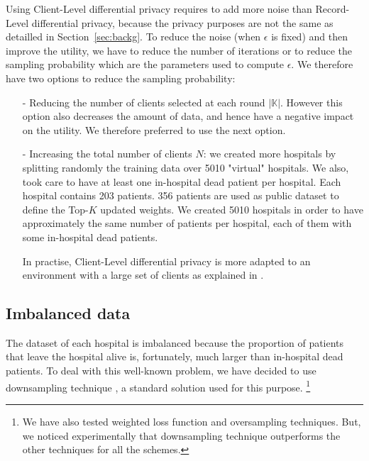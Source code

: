 \documentclass[accepted]{uai2021} %
\newcommand{\TOPK}{Top-$K$\xspace}
\begin{document}
\begin{enumerate}
    Using Client-Level differential privacy requires to add more noise than Record-Level differential privacy, because the privacy purposes are not the same as detailled in Section~\ref{sec:backg}. To reduce the noise (when $\epsilon$ is fixed) and then improve the utility, we have to reduce the number of iterations or to reduce the sampling probability which are the parameters used to compute $\epsilon$. We therefore have two options to reduce the sampling probability:
    \begin{itemize}
        \item[-] Reducing the number of clients selected at each round $|\mathbb{K}|$. However this option also decreases the amount of data, and hence have a negative impact on the utility. We therefore preferred to use the next option.
        \item[-] Increasing the total number of clients $N$: we created more hospitals by splitting randomly the training data over 5010 "virtual" hospitals. We also, took care to have at least one in-hospital dead patient per hospital. Each hospital contains 203 patients. 356 patients are used as public dataset to define the \TOPK updated weights. We created 5010 hospitals in order to have approximately the same number of patients per hospital, each of them with some in-hospital dead patients. 
        
        In practise, Client-Level differential privacy is more adapted to an environment with a large set of clients as explained in \cite{Client-DP-McMahan,Client-DP-ETH-Zurich}.
    \end{itemize}

\end{enumerate}

\subsection{Imbalanced data}


The dataset of each hospital is imbalanced because the proportion of patients that leave the hospital alive is, fortunately, much larger than in-hospital dead patients. To deal with this well-known problem, we have decided to use downsampling technique \citep{more2016survey,he2009learning}, a standard solution used for this purpose. \footnote{We have also tested weighted loss function and oversampling techniques. But, we noticed experimentally that downsampling technique outperforms the other techniques for all the schemes.} 
\end{document}
